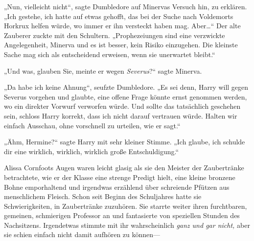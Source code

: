 „Nun, vielleicht nicht“, sagte Dumbledore auf Minervas Versuch hin, zu erklären. „Ich gestehe, ich hatte auf etwas gehofft, das bei der Suche nach Voldemorts Horkrux helfen würde, wo immer er ihn versteckt haben mag. Aber…“ Der alte Zauberer zuckte mit den Schultern. „Prophezeiungen sind eine verzwickte Angelegenheit, Minerva und es ist besser, kein Risiko einzugehen. Die kleinste Sache mag sich als entscheidend erweisen, wenn sie unerwartet bleibt.“

„Und was, glauben Sie, meinte er wegen \emph{Severus}?“ sagte Minerva.

„Da habe ich keine Ahnung“, seufzte Dumbledore. „Es sei denn, Harry will gegen Severus vorgehen und glaubte, eine offene Frage könnte ernst genommen werden, wo ein direkter Vorwurf verworfen würde. Und sollte das tatsächlich geschehen sein, schloss Harry korrekt, dass ich nicht darauf vertrauen würde. Halten wir einfach Ausschau, ohne vorschnell zu urteilen, wie er sagt.“


„Ähm, Hermine?“ sagte Harry mit sehr kleiner Stimme. „Ich glaube, ich schulde dir eine wirklich, wirklich, wirklich große Entschuldigung.“


Alissa Cornfoots Augen waren leicht glasig als sie den Meister der Zaubertränke betrachtete, wie er der Klasse eine strenge Predigt hielt, eine kleine bronzene Bohne emporhaltend und irgendwas erzählend über schreiende Pfützen aus menschlichem Fleisch. Schon seit Beginn des Schuljahres hatte sie Schwierigkeiten, in Zaubertränke zuzuhören. Sie starrte weiter ihren furchtbaren, gemeinen, schmierigen Professor an und fantasierte von speziellen Stunden des Nachsitzens. Irgendetwas stimmte mit ihr wahrscheinlich \emph{ganz und gar nicht,} aber sie schien einfach nicht damit aufhören zu können—

